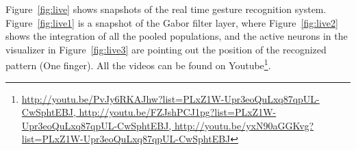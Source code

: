 Figure~\ref{fig:live} shows snapshots of the real time gesture recognition system. Figure~\ref{fig:live1} is a snapshot of the Gabor filter layer, where Figure~\ref{fig:live2} shows the integration of all the pooled populations, and the active neurons in the visualizer in Figure~\ref{fig:live3} are pointing out the position of the recognized pattern (One finger). All the videos can be found on Youtube\footnote{\url{
http://youtu.be/PvJy6RKAJhw?list=PLxZ1W-Upr3eoQuLxq87qpUL-CwSphtEBJ, http://youtu.be/FZJshPCJ1pg?list=PLxZ1W-Upr3eoQuLxq87qpUL-CwSphtEBJ, http://youtu.be/yxN90aGGKvg?list=PLxZ1W-Upr3eoQuLxq87qpUL-CwSphtEBJ}}.

%
%

